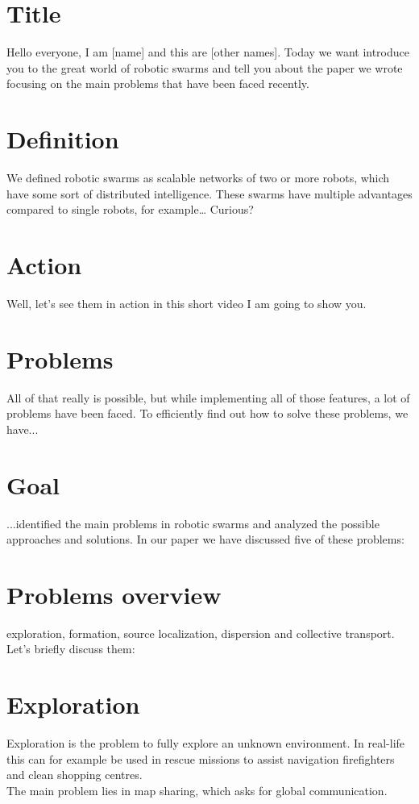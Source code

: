 \documentclass[a4paper]{article}
\begin{document}
\section*{Title}
Hello everyone, I am [name] and this are [other names]. Today we want introduce you to the great world of robotic swarms and tell you about the paper we wrote focusing on the main problems that have been faced recently.

\section*{Definition}
We defined robotic swarms as scalable networks of two or more robots, which have some sort of distributed intelligence. These swarms have multiple advantages compared to single robots, for example… Curious?

\section*{Action}
Well, let’s see them in action in this short video I am going to show you.

\section*{Problems}
All of that really is possible, but while implementing all of those features, a lot of problems have been faced. To efficiently find out how to solve these problems, we have...

\section*{Goal}
...identified the main problems in robotic swarms and analyzed the possible approaches and solutions. In our paper we have discussed five of these problems: 

\section*{Problems overview}
exploration, formation, source localization, dispersion and collective transport. Let’s briefly discuss them:

\section*{Exploration}
Exploration is the problem to fully explore an unknown environment. In real-life this can for example be used in rescue missions to assist navigation firefighters and clean shopping centres. \\
The main problem lies in map sharing, which asks for global communication.
\end{document}
